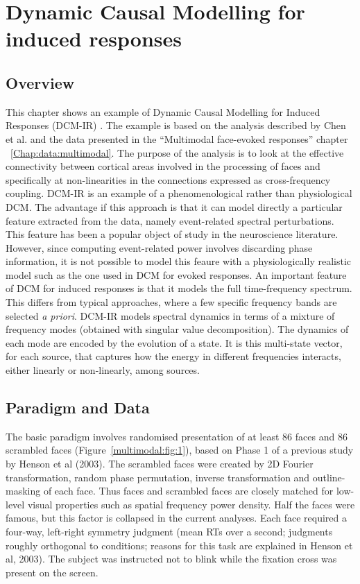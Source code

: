 \chapter{Dynamic Causal Modelling for induced responses \label{Chap:data:dcm-ir}}

\section{Overview}

This chapter shows an example of Dynamic Causal Modelling for Induced Responses (DCM-IR) \cite{cc_induced}. The example is based on the analysis described by Chen et al. \cite{cc_asymm} and the data presented in the ``Multimodal face-evoked responses'' chapter ~\ref{Chap:data:multimodal}. The purpose of the analysis is to look at the effective connectivity between cortical areas involved in the processing of faces and specifically at non-linearities in the connections expressed as cross-frequency coupling. DCM-IR is an example of a phenomenological rather than physiological DCM. The advantage if this approach is that it can model directly a particular feature extracted from the data, namely event-related spectral perturbations. This feature has been a popular object of study in the neuroscience literature. However, since computing event-related power involves discarding phase information, it is not possible to model this feaure with a physiologically realistic model such as the one used in DCM for evoked responses. An important feature of DCM for induced responses is that it models the full time-frequency spectrum. This differs from typical approaches, where a few specific frequency bands are selected \textit{a priori}. DCM-IR models spectral dynamics in terms of a mixture of frequency modes (obtained with singular value decomposition). The dynamics of each mode are encoded by the evolution of a state. It is this multi-state vector, for each source, that captures how the energy in different frequencies interacts, either linearly or non-linearly, among sources.

\section{Paradigm and Data}

The basic paradigm involves randomised presentation of at least 86 faces and 86 scrambled faces (Figure~\ref{multimodal:fig:1}), based on Phase 1 of a previous study by Henson et al (2003). The scrambled faces were created by 2D Fourier transformation, random phase permutation, inverse transformation and outline-masking of each face. Thus faces and scrambled faces are closely matched for low-level visual properties such as spatial frequency power density. Half the faces were famous, but this factor is collapsed in the current analyses. Each face required a four-way, left-right symmetry judgment (mean RTs over a second; judgments roughly orthogonal to conditions; reasons for this task are explained in Henson et al, 2003). The subject was instructed not to blink while the fixation cross was present on the screen.


